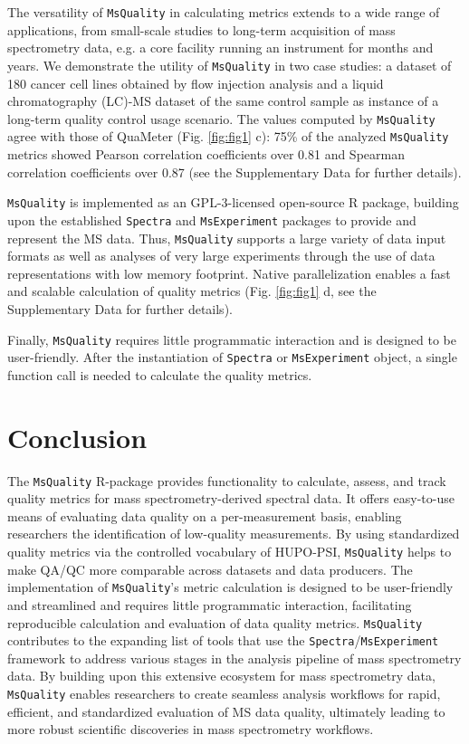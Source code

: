 \documentclass{bioinfo}
\begin{document}
The versatility of \texttt{MsQuality} in calculating metrics extends to a wide range of
applications, from small-scale studies to long-term acquisition of mass spectrometry
data, e.g. a core facility running an instrument for months and years. 
We demonstrate the utility of \texttt{MsQuality} in two case studies: a 
dataset of 180 cancer cell lines obtained by flow injection analysis
\citep{Cherkaoui2022} and a liquid chromatography (LC)-MS dataset of the same 
control sample \citep{Amidan2014} as instance of a long-term quality control 
usage scenario. The values computed by \texttt{MsQuality}
agree with those of QuaMeter \citep{Ma2012} (Fig. \ref{fig:fig1} c): 
75\% of the analyzed \texttt{MsQuality} metrics showed Pearson correlation 
coefficients over 0.81 and Spearman correlation coefficients over 0.87
(see the Supplementary Data for further details).

\texttt{MsQuality} is implemented as an GPL-3-licensed open-source R package, 
building upon the established \texttt{Spectra} and \texttt{MsExperiment} packages
\citep{Rainer2022} to provide and represent the MS data. Thus, \texttt{MsQuality} 
supports a large variety of data input formats
as well as analyses of very large experiments through the use of data
representations with low memory footprint. Native parallelization enables a fast
and scalable calculation of quality metrics (Fig. \ref{fig:fig1} d, 
see the Supplementary Data for further details).

Finally, \texttt{MsQuality} requires little programmatic interaction and is designed to be
user-friendly.  After the instantiation of \texttt{Spectra} or \texttt{MsExperiment}
object, a single function call is needed to calculate the quality metrics.


\section{Conclusion}

The \texttt{MsQuality} R-package provides functionality to calculate, assess, 
and track quality metrics for mass spectrometry-derived spectral data. 
It offers easy-to-use means of evaluating data quality on a per-measurement 
basis, enabling researchers the identification of low-quality measurements.
By using standardized quality metrics via the controlled vocabulary of HUPO-PSI,
\texttt{MsQuality} helps to make QA/QC more comparable across datasets and 
data producers.
The implementation of \texttt{MsQuality}'s metric calculation is designed
to be user-friendly and streamlined and requires little programmatic 
interaction, facilitating reproducible calculation and evaluation of data 
quality metrics.
\texttt{MsQuality} contributes to the expanding list of 
tools that use the \texttt{Spectra}/\texttt{MsExperiment} framework 
\citep{Rainer2022} to address various stages in the analysis pipeline of 
mass spectrometry data. By building upon this extensive ecosystem for 
mass spectrometry data, 
\texttt{MsQuality} enables researchers to create seamless analysis workflows 
for rapid, efficient, and standardized evaluation of MS data quality, 
ultimately leading to more robust scientific discoveries in mass spectrometry
workflows.
\end{document}
